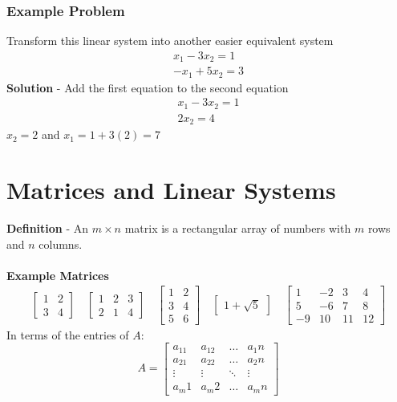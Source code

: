 \subsubsection{Example Problem}
Transform this linear system into another easier equivalent system
\[
  \begin{aligned}
    x_1 - 3x_2 = 1 \\
    -x_1 + 5x_2 = 3
  \end{aligned}
\]
\textbf{Solution} - Add the first equation to the second equation
\[
  \begin{aligned}
    x_1 - 3x_2 = 1 \\
    2x_2 = 4
  \end{aligned}
\]
$x_2 = 2$ and $x_1 = 1 + 3(2) = 7$
\section{Matrices and Linear Systems}
\textbf{Definition} - An $m \times n$ matrix is a rectangular array of numbers with $m$ rows and $n$ columns. \\\\
\textbf{Example Matrices}
\[
  \begin{aligned}
    \begin{bmatrix}
      1 & 2 \\
      3 & 4
    \end{bmatrix} \quad
    \begin{bmatrix}
      1 & 2 & 3 \\
      2 & 1 & 4
    \end{bmatrix} \quad
    \begin{bmatrix}
      1 & 2 \\
      3 & 4 \\
      5 & 6
    \end{bmatrix} \quad
    \begin{bmatrix}
      1 + \sqrt{5}
    \end{bmatrix} \quad
    \begin{bmatrix}
      1 & -2 & 3 & 4 \\
      5 & -6 & 7 & 8 \\
      -9 & 10 & 11 & 12
    \end{bmatrix}
  \end{aligned}
\]
In terms of the entries of $A$:
\[ A = \begin{bmatrix}
    a_11 & a_12 & \dots & a_1n \\
    a_21 & a_22 & \dots & a_2n \\
   \vdots & \vdots & \ddots & \vdots \\
    a_m1 & a_m2 & \dots & a_mn
  \end{bmatrix} \]
